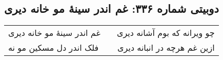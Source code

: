 \begin{center}
\section*{دوبیتی شماره ۳۳۶: غم اندر سینهٔ مو خانه دیری}
\label{sec:336}
\begin{longtable}{l p{0.5cm} r}
غم اندر سینهٔ مو خانه دیری
&&
چو ویرانه که بوم آشانه دیری
\\
فلک اندر دل مسکین مو نه
&&
ازین غم هرچه در انبانه دیری
\\
\end{longtable}
\end{center}
